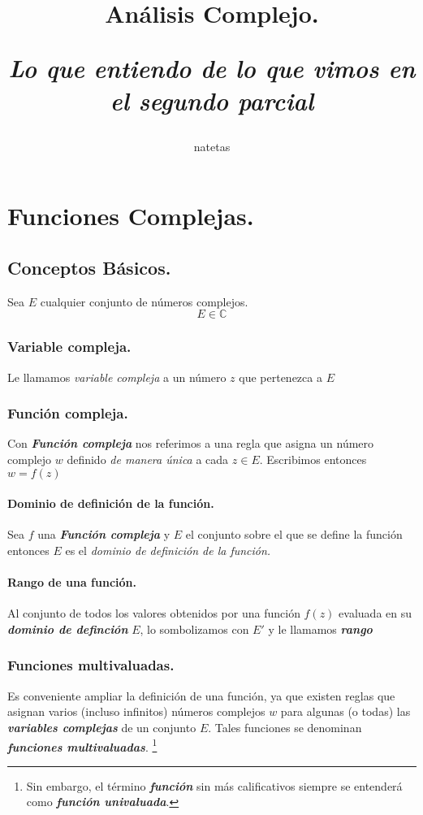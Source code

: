 \documentclass[10pt,a4paper]{book}
\author{natetas}
\title{	Análisis Complejo.
		\\ 
		\begin{small}
			\textit{Lo que entiendo de lo que vimos en el segundo parcial} 
		\end{small}
		}
\begin{document}
\maketitle
\newpage
\tableofcontents
\chapter{Funciones Complejas.}
\section{Conceptos Básicos.}
Sea $E$ cualquier conjunto de números complejos.
$$
	E \in \mathbb{C}
$$
\subsection{Variable compleja.}
Le llamamos \textit{\textit{variable compleja}} a un número $z$ que pertenezca a $E$

\subsection{Función compleja.}
Con \textbf{\textit{Función compleja}} nos referimos a una regla que asigna un número complejo $w$ definido \textit{de manera única} a cada $z\in E$. Escribimos entonces $w=f(z)$
\subsubsection{Dominio de definición de la función.}
Sea $f$ una \textbf{\textit{Función compleja}} y $E$ el conjunto sobre el que se define la función entonces $E$ es el \textit{dominio de definición de la función.}
\subsubsection{Rango de una función.}
Al conjunto de todos los valores obtenidos por una función $f(z)$ evaluada en su \textbf{\textit{dominio de definción}} $E$, lo sombolizamos con $E'$ y le llamamos \textbf{\textit{rango}} 

\subsection{Funciones multivaluadas.}
Es conveniente ampliar la definición de una función, ya que existen reglas que asignan varios (incluso infinitos) números complejos $w$ para algunas (o todas) las \textbf{\textit{variables complejas}} de un conjunto $E$.
Tales funciones se denominan \textit{\textbf{funciones multivaluadas}}. \footnote{Sin embargo, el término \textbf{\textit{función}} sin más calificativos siempre se entenderá como \textbf{\textit{función univaluada}}.}
\end{document}
